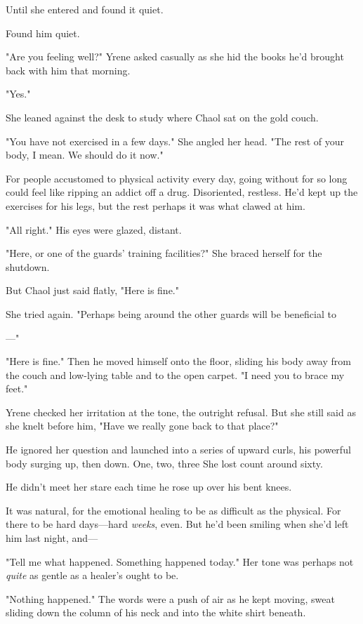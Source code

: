 Until she entered and found it quiet.

Found him quiet.

"Are you feeling well?" Yrene asked casually as she hid the books he'd brought back with him that morning.

"Yes."

She leaned against the desk to study where Chaol sat on the gold couch.

"You have not exercised in a few days." She angled her head. "The rest of your body, I mean. We should do it now."

For people accustomed to physical activity every day, going without for so long could feel like ripping an addict off a drug. Disoriented, restless. He'd kept up the exercises for his legs, but the rest 
perhaps it was what clawed at him.

"All right." His eyes were glazed, distant.

"Here, or one of the guards' training facilities?" She braced herself for the shutdown.

But Chaol just said flatly, "Here is fine."

She tried again. "Perhaps being around the other guards will be beneficial to

---"

"Here is fine." Then he moved himself onto the floor, sliding his body away from the couch and low-lying table and to the open carpet. "I need you to brace my feet."

Yrene checked her irritation at the tone, the outright refusal. But she still said as she knelt before him, "Have we really gone back to that place?"

He ignored her question and launched into a series of upward curls, his powerful body surging up, then down. One, two, three  She lost count around sixty.

He didn't meet her stare each time he rose up over his bent knees.

It was natural, for the emotional healing to be as difficult as the physical. For there to be hard days---hard \emph{weeks}, even. But he'd been smiling when she'd left him last night, and---

"Tell me what happened. Something happened today." Her tone was perhaps not \emph{quite} as gentle as a healer's ought to be.

"Nothing happened." The words were a push of air as he kept moving, sweat sliding down the column of his neck and into the white shirt beneath.

